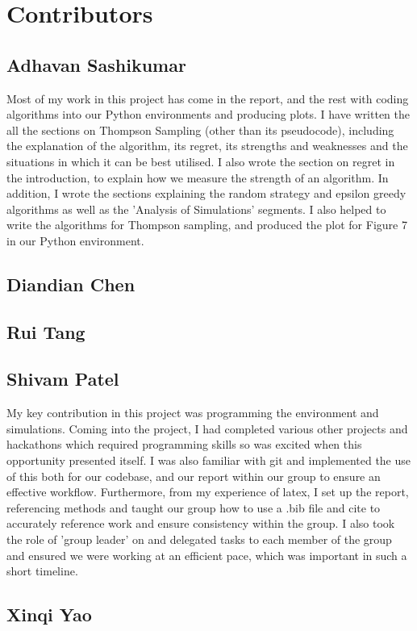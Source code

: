 \section{Contributors}\label{sec:contributors}

\subsection{Adhavan Sashikumar}\label{subsec:adhavan-sashikumar}
Most of my work in this project has come in the report, and the rest with coding algorithms into our Python environments and producing plots. I have written the all the sections on Thompson Sampling (other than its pseudocode), including the explanation of the algorithm, its regret, its strengths and weaknesses and the situations in which it can be best utilised. I also wrote the section on regret in the introduction, to explain how we measure the strength of an algorithm. In addition, I wrote the sections explaining the random strategy and epsilon greedy algorithms as well as the 'Analysis of Simulations' segments. I also helped to write the algorithms for Thompson sampling, and produced the plot for Figure 7 in our Python environment. 

\subsection{Diandian Chen}\label{subsec:diandian-chen}

\subsection{Rui Tang}\label{subsec:rui-tang}

\subsection{Shivam Patel}\label{subsec:shivam-patel}
My key contribution in this project was programming the environment and simulations.
Coming into the project, I had completed various other projects and hackathons which required programming skills so was excited when this opportunity presented itself.
I was also familiar with git and implemented the use of this both for our codebase, and our report within our group to ensure an effective workflow.
Furthermore, from my experience of latex, I set up the report, referencing methods and taught our group how to use a .bib file and cite to accurately reference work and ensure consistency within the group.
I also took the role of 'group leader' on and delegated tasks to each member of the group and ensured we were working at an efficient pace, which was important in such a short timeline.

\subsection{Xinqi Yao}\label{subsec:xinqi-yao}
